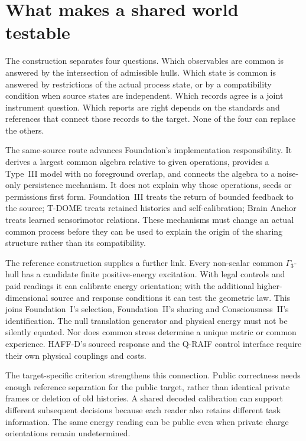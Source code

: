 \section{What makes a shared world testable}\label{sec:open}

The construction separates four questions. Which observables are common is
answered by the intersection of admissible hulls. Which state is common is
answered by restrictions of the actual process state, or by a compatibility
condition when source states are independent. Which records agree is a joint
instrument question. Which reports are right depends on the standards and
references that connect those records to the target. None of the four can
replace the others.

The same-source route advances Foundation's implementation responsibility.
It derives a largest common algebra relative to given operations, provides
a Type~III model with no foreground overlap, and connects the algebra to a
noise-only persistence mechanism. It does not explain why those operations,
seeds or permissions first form. Foundation~III treats the return of bounded
feedback to the source; T-DOME treats retained histories and self-calibration;
Brain Anchor treats learned sensorimotor relations. These mechanisms must
change an actual common process before they can be used to explain the origin
of the sharing structure rather than its compatibility.

The reference construction supplies a further link. Every non-scalar common
$\Gamma_3$-hull has a candidate finite positive-energy excitation. With legal
controls and paid readings it can calibrate energy orientation; with the
additional higher-dimensional source and response conditions it can test the
geometric law. This joins Foundation~I's selection, Foundation~II's sharing
and Consciousness~II's identification. The null translation generator and
physical energy must not be silently equated. Nor does common stress determine
a unique metric or common experience. HAFF-D's sourced response and the
Q-RAIF control interface require their own physical couplings and costs.

The target-specific criterion strengthens this connection. Public correctness
needs enough reference separation for the public target, rather than identical
private frames or deletion of old histories. A shared decoded calibration
can support different subsequent decisions because each reader also retains
different task information. The same energy reading can be public even when
private charge orientations remain undetermined.

